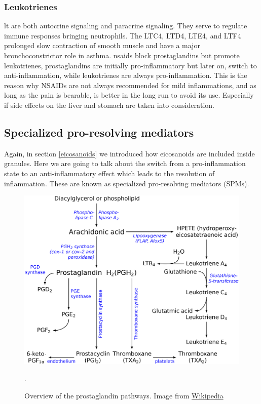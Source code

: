 \subsubsection{Leukotrienes}
\label{in:lt}

\gls{lt} are both autocrine signaling and paracrine signaling. They serve to regulate immune responses bringing neutrophils. The LTC4, LTD4, LTE4, and LTF4 prolonged slow contraction of smooth muscle and have a major bronchoconstrictor role in asthma. \gls{nsaids} block prostaglandins but promote leukotrienes, prostaglandins are initially pro-inflammatory but later on, switch to anti-inflammation, while leukotrienes are always pro-inflammation. This is the reason why NSAIDs are not always recommended for mild inflammations, and as long as the pain is bearable, is better in the long run to avoid its use. Especially if side effects on the liver and stomach are taken into consideration.

\subsection{Specialized pro-resolving mediators}
\label{arcachonidacids}
\label{in:spm}

Again, in section \ref{eicosanoids} we introduced how eicosanoids are included inside granules. Here we are going to talk about the switch from a pro-inflammation state to an anti-inflammatory effect which leads to the resolution of inflammation. These are known as specialized pro-resolving mediators (SPMs).

        \begin{figure}[h!]
            \centering
                \includegraphics[width=0.7\linewidth]{figures/Inflammation/2560px-Eicosanoid_synthesis.svg.png} 
            \caption{Overview of the prostaglandin pathways. Image from \href{https://en.wikipedia.org/wiki/File:Eicosanoid_synthesis.svg}{Wikipedia}}.
            \label{figure:Phell}
        \end{figure}  


